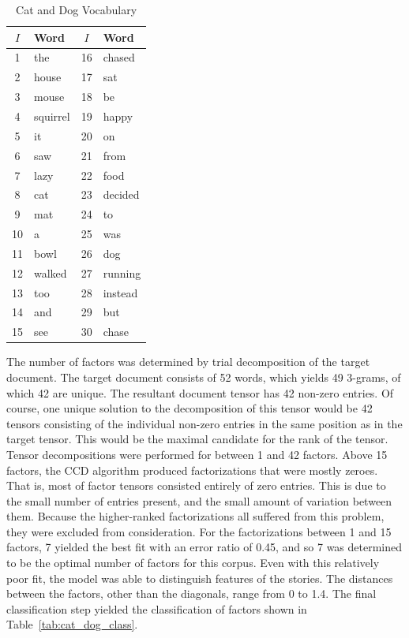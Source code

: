 \documentclass[../ut-dissertation.tex]{subfiles}
\begin{document}
\begin{table}[p]
  \centering
  \caption{Cat and Dog Vocabulary}\label{tab:catdog_vocabulary}
  \begin{tabular}{|c|l||c|l|}
    \hline
    $I$ & Word & $I$ & Word\\ 
    \hline
    1 & the & 16 & chased \\
    2 & house & 17 & sat \\
    3 & mouse & 18 & be \\
    4 & squirrel & 19 & happy \\
    5 & it & 20 & on\\
    6 & saw & 21 & from \\
    7 & lazy & 22 & food \\
    8 & cat & 23 & decided \\
    9 & mat & 24 & to\\
   10 & a & 25 & was \\
   11 & bowl & 26 & dog \\
   12 & walked & 27 & running \\
   13 & too & 28 & instead \\
   14 & and & 29 & but \\
   15 & see & 30 & chase\\
    \hline
  \end{tabular}
\end{table}
\FloatBarrier

The number of factors was determined by trial decomposition of the
target document.  The target document consists of 52 words, which
yields 49 3-grams, of which 42 are unique.  The resultant document
tensor has 42 non-zero entries.  Of course, one unique solution to the
decomposition of this tensor would be 42 tensors consisting of the
individual non-zero entries in the same position as in the target
tensor.  This would be the maximal candidate for the rank of the
tensor.  Tensor decompositions were performed for between 1 and 42
factors.  Above 15 factors, the CCD algorithm produced factorizations
that were mostly zeroes.  That is, most of factor tensors consisted
entirely of zero entries.  This is due to the small number of entries
present, and the small amount of variation between them.  Because the
higher-ranked factorizations all suffered from this problem, they were
excluded from consideration.  For the factorizations between 1 and 15
factors, 7 yielded the best fit with an error ratio of 0.45, and so 7
was determined to be the optimal number of factors for this
corpus. Even with this relatively poor fit, the model was able to
distinguish features of the stories.  The distances between the
factors, other than the diagonals, range from 0 to 1.4.  The final
classification step yielded the classification of factors shown in
Table~\ref{tab:cat_dog_class}.
\end{document}
